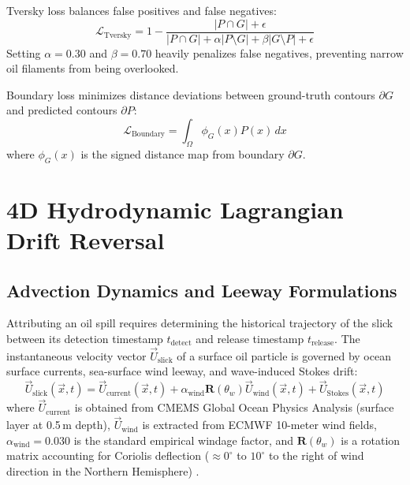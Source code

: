 \documentclass[conference]{IEEEtran}
\begin{document}
Tversky loss balances false positives and false negatives:
\begin{equation}
\mathcal{L}_{\text{Tversky}} = 1 - \frac{|P \cap G| + \epsilon}{|P \cap G| + \alpha |P \setminus G| + \beta |G \setminus P| + \epsilon}
\label{eq:tversky_loss}
\end{equation}
Setting $\alpha = 0.30$ and $\beta = 0.70$ heavily penalizes false negatives, preventing narrow oil filaments from being overlooked.

Boundary loss minimizes distance deviations between ground-truth contours $\partial G$ and predicted contours $\partial P$:
\begin{equation}
\mathcal{L}_{\text{Boundary}} = \int_{\Omega} \phi_G(x) P(x) \, dx
\label{eq:boundary_loss}
\end{equation}
where $\phi_G(x)$ is the signed distance map from boundary $\partial G$.

\section{4D Hydrodynamic Lagrangian Drift Reversal}

\subsection{Advection Dynamics and Leeway Formulations}
Attributing an oil spill requires determining the historical trajectory of the slick between its detection timestamp $t_{\text{detect}}$ and release timestamp $t_{\text{release}}$. The instantaneous velocity vector $\vec{U}_{\text{slick}}$ of a surface oil particle is governed by ocean surface currents, sea-surface wind leeway, and wave-induced Stokes drift:
\begin{equation}
\vec{U}_{\text{slick}}(\vec{x}, t) = \vec{U}_{\text{current}}(\vec{x}, t) + \alpha_{\text{wind}} \mathbf{R}(\theta_w) \vec{U}_{\text{wind}}(\vec{x}, t) + \vec{U}_{\text{Stokes}}(\vec{x}, t)
\label{eq:slick_velocity}
\end{equation}
where $\vec{U}_{\text{current}}$ is obtained from CMEMS Global Ocean Physics Analysis (surface layer at 0.5\,m depth), $\vec{U}_{\text{wind}}$ is extracted from ECMWF 10-meter wind fields, $\alpha_{\text{wind}} = 0.030$ is the standard empirical windage factor, and $\mathbf{R}(\theta_w)$ is a rotation matrix accounting for Coriolis deflection ($\approx 0^\circ$ to $10^\circ$ to the right of wind direction in the Northern Hemisphere) \cite{dagestad2018opendrift, breivik2013wind}.
\end{document}
